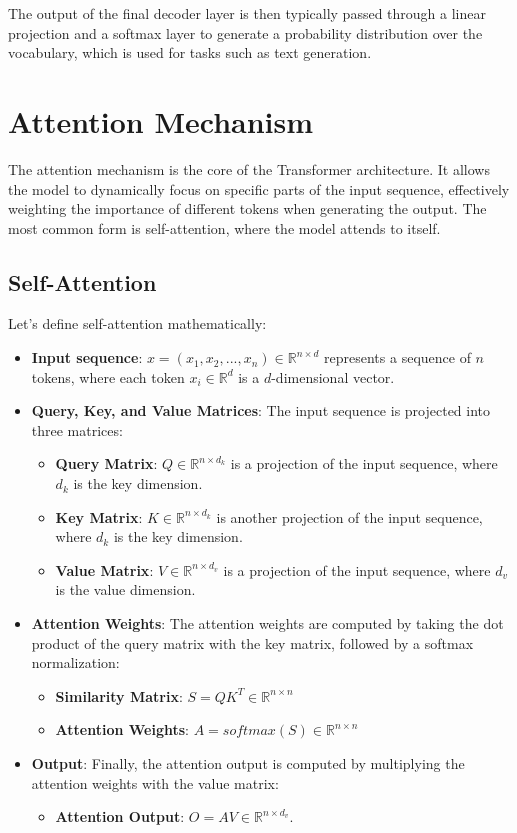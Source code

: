 \documentclass[12pt,a4paper]{report}
\begin{document}
The output of the final decoder layer is then typically passed through a linear projection and a softmax layer to generate a probability distribution over the vocabulary, which is used for tasks such as text generation.

\section{Attention Mechanism}
The attention mechanism \cite{transformers} is the core of the Transformer architecture. It allows the model to dynamically focus on specific parts of the input sequence, effectively weighting the importance of different tokens when generating the output. The most common form is self-attention, where the model attends to itself.

\subsection{Self-Attention}
Let's define self-attention mathematically:
\begin{itemize}
    \item \textbf{Input sequence}: $x = (x_1, x_2, ..., x_n) \in \mathbb{R}^{n \times d}$ represents a sequence of $n$ tokens, where each token $x_i \in \mathbb{R}^d$ is a $d$-dimensional vector.
    \item \textbf{Query, Key, and Value Matrices}: The input sequence is projected into three matrices:
    \begin{itemize}
        \item \textbf{Query Matrix}: $Q \in \mathbb{R}^{n \times d_k}$ is a projection of the input sequence, where $d_k$ is the key dimension.
        \item \textbf{Key Matrix}: $K \in \mathbb{R}^{n \times d_k}$ is another projection of the input sequence, where $d_k$ is the key dimension.
        \item \textbf{Value Matrix}: $V \in \mathbb{R}^{n \times d_v}$ is a projection of the input sequence, where $d_v$ is the value dimension.
    \end{itemize}
    \item \textbf{Attention Weights}: The attention weights are computed by taking the dot product of the query matrix with the key matrix, followed by a softmax normalization:
    \begin{itemize}
        \item \textbf{Similarity Matrix}: $S = QK^T \in \mathbb{R}^{n \times n}$
        \item \textbf{Attention Weights}: $A = softmax(S) \in \mathbb{R}^{n \times n}$
    \end{itemize}
    \item \textbf{Output}: Finally, the attention output is computed by multiplying the attention weights with the value matrix:
    \begin{itemize}
        \item \textbf{Attention Output}: $O = AV \in \mathbb{R}^{n \times d_v}$.
    \end{itemize}
\end{itemize}
\end{document}
